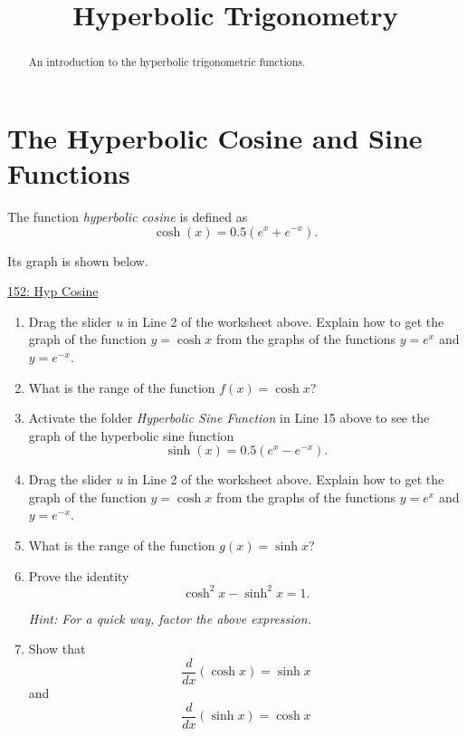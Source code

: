 \documentclass{ximera}
\title{Hyperbolic Trigonometry}
\begin{document}
\begin{abstract}
An introduction to the hyperbolic trigonometric functions.
\end{abstract}
\maketitle


\section{The Hyperbolic Cosine and Sine Functions}

The function \emph{hyperbolic cosine} is defined as
\[
    \cosh(x) = 0.5(e^x + e^{-x}  ).
\]

Its graph is shown below.

\begin{onlineOnly}
    \begin{center}
\end{center}
\end{onlineOnly}

\href{https://www.desmos.com/calculator/nubdwzgsa9}{152: Hyp Cosine}

\begin{enumerate}
\item Drag the slider $u$ in Line 2 of the worksheet above. Explain how to get the graph of the function $y=\cosh x$ from the graphs of the functions $y=e^x$ and $y=e^{-x}$.

\begin{freeResponse}
\end{freeResponse}

\item What is the range of the function $f(x)=\cosh x$?

\item Activate the folder \emph{Hyperbolic Sine Function} in Line 15 above to see the graph of the hyperbolic sine function
\[
   \sinh(x) = 0.5(e^x - e^{-x}  ).
\]
\item Drag the slider $u$ in Line 2 of the worksheet above. Explain how to get the graph of the function $y=\cosh x$ from the graphs of the functions $y=e^x$ and $y=e^{-x}$.
\begin{freeResponse}
\end{freeResponse}

\item What is the range of the function $g(x)=\sinh x$?

\item Prove the identity 
\[
      \cosh^2x - \sinh^2x = 1.
\]

\emph{Hint: For a quick way, factor the above expression.}

\item Show that 
\[
   \frac{d}{dx} \left( \cosh x  \right) = \sinh x
\]
and
\[
   \frac{d}{dx} \left( \sinh x  \right) = \cosh x
\]

\end{enumerate}
\end{document}
